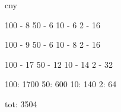 cny

100 - 8
50 - 6
10 - 6
2 - 16

100 - 9
50 - 6
10 - 8
2 - 16

100 - 17
50 - 12
10 - 14
2 - 32

100: 1700
50: 600
10: 140
2: 64

tot: 3504
